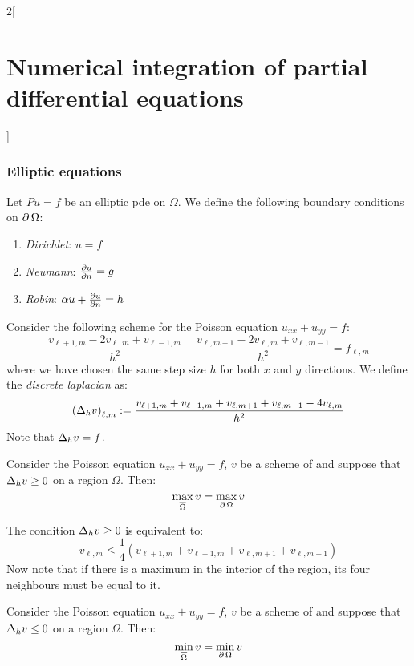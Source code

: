 \documentclass[../../../main_math.tex]{subfiles}
\begin{document}
\begin{multicols}{2}[\section{Numerical integration of partial differential equations}]
  \subsubsection{Elliptic equations}
  \begin{definition}
    Let $Pu=f$ be an elliptic pde on $\Omega$. We define the following boundary conditions on $\operatorname{\partial}{\Omega}$:
    \begin{enumerate}
      \item \emph{Dirichlet}: $u=f$
      \item \emph{Neumann}: $\pdv{u}{n}=g$
      \item \emph{Robin}: $\alpha u+\pdv{u}{n}=h$
    \end{enumerate}
  \end{definition}
  \begin{definition}
    Consider the following scheme for the Poisson equation $u_{xx}+u_{yy}=f$:
    \begin{equation}\label{NIPDE:poisson_eq}
      \frac{v_{\ell+1,m}-2v_{\ell,m}+v_{\ell-1,m}}{h^2}+\frac{v_{\ell,m+1}-2v_{\ell,m}+v_{\ell,m-1}}{h^2}\!=\!f_{\ell,m}
    \end{equation}
    where we have chosen the same step size $h$ for both $x$ and $y$ directions. We define the \emph{discrete laplacian} as:
    $$
      {(\Delta_h v)}_{\ell,m}:=\frac{v_{\ell+1,m}+v_{\ell-1,m}+v_{\ell,m+1}+v_{\ell,m-1}-4v_{\ell,m}}{h^2}
    $$
    Note that $\Delta_hv=f$.
  \end{definition}
  \begin{theorem}\label{NIPDE:maximumPrinc}
    Consider the Poisson equation $u_{xx}+u_{yy}=f$, $v$ be a scheme of  and suppose that $\Delta_hv\geq 0$ on a region $\Omega$. Then:
    $$\max_{\overline{\Omega}} v=\max_{\operatorname{\partial}{\Omega}} v$$
  \end{theorem}
  \begin{sproof}
    The condition $\Delta_hv\geq 0$ is equivalent to:
    $$
      v_{\ell,m}\leq \frac{1}{4}(v_{\ell+1,m}+v_{\ell-1,m}+v_{\ell,m+1}+v_{\ell,m-1})
    $$
    Now note that if there is a maximum in the interior of the region, its four neighbours must be equal to it.
  \end{sproof}
  \begin{corollary}\label{NIPDE:minimumPrinc}
    Consider the Poisson equation $u_{xx}+u_{yy}=f$, $v$ be a scheme of  and suppose that $\Delta_hv\leq 0$ on a region $\Omega$. Then:
    $$\min_{\overline{\Omega}} v=\min_{\operatorname{\partial}{\Omega}} v$$

\end{corollary}
\end{multicols}
\end{document}
